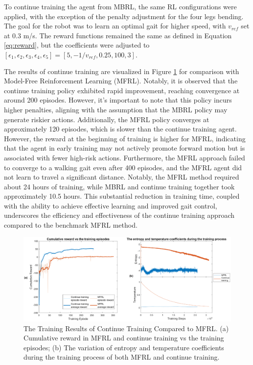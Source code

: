 To continue training the agent from MBRL, the same RL configurations were applied, with the exception of the penalty adjustment for the four legs bending. The goal for the robot was to learn an optimal gait for higher speed, with $v_{ref}$ set at 0.3 m/s. The reward functions remained the same as defined in Equation \ref{eq:reward}, but the coefficients were adjusted to $[\epsilon_1, \epsilon_2, \epsilon_3, \epsilon_4, \epsilon_5] = [5, −1/v_{ref}, 0.25, 100, 3]$. 

The results of continue training are visualized in Figure \ref{fig:MFRLvsCT} for comparison with Model-Free Reinforcement Learning (MFRL). Notably, it is observed that the continue training policy exhibited rapid improvement, reaching convergence at around 200 episodes. However, it's important to note that this policy incurs higher penalties, aligning with the assumption that the MBRL policy may generate riskier actions. Additionally, the MFRL policy converges at approximately 120 episodes, which is slower than the continue training agent. However, the reward at the beginning of training is higher for MFRL, indicating that the agent in early training may not actively promote forward motion but is associated with fewer high-risk actions. Furthermore, the MFRL approach failed to converge to a walking gait even after 400 episodes, and the MFRL agent did not learn to travel a significant distance. Notably, the MFRL method required about 24 hours of training, while MBRL and continue training together took approximately 10.5 hours. This substantial reduction in training time, coupled with the ability to achieve effective learning and improved gait control, underscores the efficiency and effectiveness of the continue training approach compared to the benchmark MFRL method.
\begin{figure}[htb]
    \centering
    \includegraphics[width=\linewidth]{img/chap5/MFRLvsCT.eps}
    \caption{The Training Results of Continue Training Compared to MFRL. (a) Cumulative reward in MFRL and continue training vs the training episodes; (b) The variation of entropy and temperature coefficients during the training process of both MFRL and continue training.}
    \label{fig:MFRLvsCT}
\end{figure}

